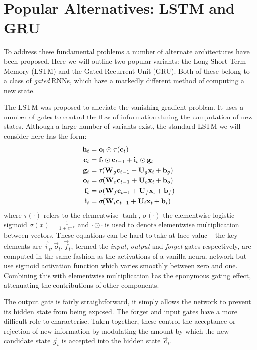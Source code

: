 \section{Popular Alternatives: LSTM and GRU}
To address these fundamental problems a number of alternate architectures have been proposed.
Here we will outline two popular variants: the Long Short Term Memory (LSTM) and the Gated
Recurrent Unit (GRU). Both of these belong to a class of \emph{gated} RNNs, which have a
markedly different method of computing a new state.

The LSTM was proposed to alleviate the vanishing gradient problem. It uses a number of gates
to control the flow of information during the computation of new states. Although a large number
of variants exist, the standard LSTM we will consider here has the form: 
\autocite{Hochreiter1997, Graves2013}
\begin{align}\label{eq:LSTM}
	\mathbf{h}_t &= \mathbf{o}_i \odot \tau(\mathbf{c}_t)\\
	\mathbf{c}_t &= \mathbf{f}_t \odot \mathbf{c}_{t-1} + \mathbf{i}_t \odot \mathbf{g}_t\\
	\mathbf{g}_t &= \tau(\mathbf{W}_g \mathbf{c}_{t-1} + \mathbf{U}_g \mathbf{x}_t + \mathbf{b}_g)\\
	\mathbf{o}_t &= \sigma(\mathbf{W}_o \mathbf{c}_{t-1} + \mathbf{U}_o \mathbf{x}_t + \mathbf{b}_o)\\
	\mathbf{f}_t &= \sigma(\mathbf{W}_f \mathbf{c}_{t-1} + \mathbf{U}_f \mathbf{x}_t + \mathbf{b}_f)\\
	\mathbf{i}_t &= \sigma(\mathbf{W}_i \mathbf{c}_{t-1} + \mathbf{U}_i \mathbf{x}_t + \mathbf{b}_i)
\end{align} where \(\tau(\cdot)\) refers to the elementwise \(\tanh\), \(\sigma(\cdot)\) the
elementwise logistic sigmoid \(\sigma(x) = \frac{1}{1 + e^{-x}}\) and \(\cdot \odot \cdot\)
is used to denote elementwise multiplication between vectors. These equations can be hard to take
at face value -- the key elements are \(\vec{i}_t, \vec{o}_t, \vec{f}_t\), termed the
\emph{input}, \emph{output} and \emph{forget} gates respectively, are computed in the same fashion
as the activations of a vanilla neural network but use sigmoid activation function which varies
smoothly between zero and one. Combining this with elementwise multiplication has the eponymous
gating effect, attenuating the contributions of other components. 

The output gate is fairly straightforward, it simply allows the network to prevent its hidden
state from being exposed. The forget and input gates have a more difficult role to characterise.
Taken together, these control the acceptance or rejection of new information by modulating the
amount by which the new candidate state \(\vec{g}_t\) is accepted into the hidden state
\(\vec{c}_t\).

